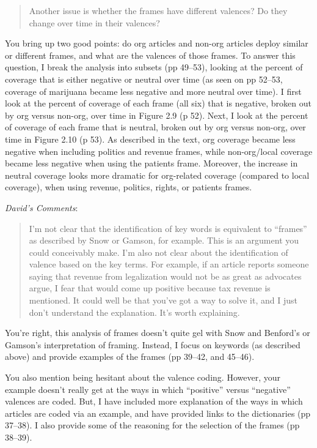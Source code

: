 \documentclass[12pt,stdletter,dateno,sigleft]{newlfm} %
\begin{document}
\begin{newlfm}
\begin{quotation}
{\noindent Another issue is whether the frames have different valences?  Do they change over time in their valences? 
}
\end{quotation}

You bring up two good points: do org articles and non-org articles deploy similar or different frames, and what are the valences of those frames. To answer this question, I break the analysis into subsets (pp 49--53), looking at the percent of coverage that is either negative or neutral over time (as seen on pp 52--53, coverage of marijuana became less negative and more neutral over time). I first look at the percent of coverage of each frame (all six) that is negative, broken out by org versus non-org, over time in Figure 2.9 (p 52). Next, I look at the percent of coverage of each frame that is neutral, broken out by org versus non-org, over time in Figure 2.10 (p 53). As described in the text, org coverage became less negative when including politics and revenue frames, while non-org/local coverage became less negative when using the patients frame. Moreover, the increase in neutral coverage looks more dramatic for org-related coverage (compared to local coverage), when using revenue, politics, rights, or patients frames. \newline

\textit{David's Comments}:


\begin{quotation}{\color{red}\noindent \footnotesize
I'm not clear that the identification of key words is equivalent to ``frames'' as described by Snow or Gamson, for example. This is an argument you could conceivably make. I'm also not clear about the identification of valence based on the key terms. For example, if an article reports someone saying that revenue from legalization would not be as great as advocates argue, I fear that would come up positive because tax revenue is mentioned. It could well be that you've got a way to solve it, and I just don't understand the explanation. It's worth explaining.
}
\end{quotation}




You're right, this analysis of frames doesn't quite gel with Snow and Benford's or Gamson's interpretation of framing. Instead, I focus on keywords (as described above) and provide examples of the frames (pp 39--42, and 45--46). 

You also mention being hesitant about the valence coding. However, your example doesn't really get at the ways in which ``positive'' versus ``negative'' valences are coded. But, I have included more explanation of the ways in which articles are coded via an example, and have provided links to the dictionaries (pp 37--38). I also provide some of the reasoning for the selection of the frames (pp 38--39).






\end{newlfm}
\end{document}
